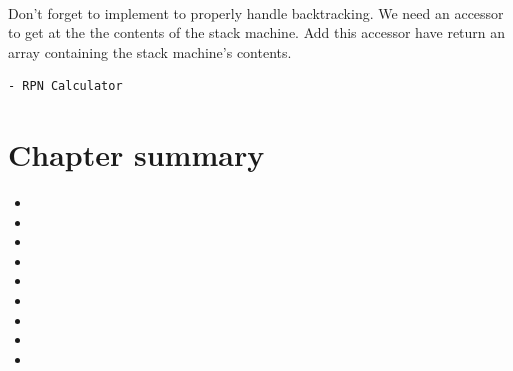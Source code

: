 \documentclass[a4paper,10pt,twoside]{book}
\begin{document}
\



Don't forget to implement  to properly handle backtracking.
We need an accessor to get at the the contents of the stack machine.
Add this accessor have  return an array containing the stack machine's contents.

\begin{verbatim}
- RPN Calculator
\end{verbatim}

\section{Chapter summary}

\begin{itemize}
  \item 
  \item 
  \item 
  \item 
  \item 
  \item 
  \item 
  \item 
  \item 
\end{itemize}


\ifx\wholebook\relax\else 
   
   
\end{document}
